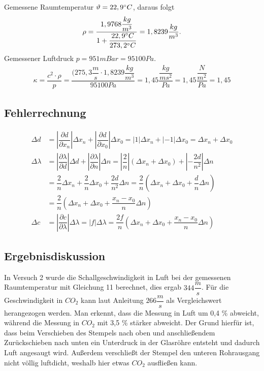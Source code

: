 \documentclass{scrartcl}
\begin{document}
Gemessene Raumtemperatur $\vartheta = 22,9\degree C$, daraus folgt 
\begin{align*}
\rho =  \dfrac{1,9768 \dfrac{kg}{m^3}}{1 + \dfrac{22,9\degree C}{273,2 \degree C}} = 1,8239 \dfrac{kg}{m^3}.
\end{align*}
Gemessener Luftdruck $p = 951 mBar = 95100 Pa$.
\begin{align*}
\kappa = \dfrac{c^2 \cdot \rho}{p} = \dfrac{(275,3 \dfrac{m}{s} \cdot 1,8239 \dfrac{kg}{m^3}}{95100 Pa} = 1,45 \dfrac{\dfrac{kg}{ms^2}}{Pa} = 1,45 \dfrac{\dfrac{N}{m^2}}{Pa} = 1,45
\end{align*}
\subsection{Fehlerrechnung}
\begin{align*}
\Delta d & = \left| \dfrac{\partial d}{\partial x_{n}} \right| \Delta x_{n} + \left| \dfrac{\partial d}{\partial x_{0}} \right| \Delta x_{0} = \left| 1 \right| \Delta x_{n} + \left| -1 \right| \Delta x_{0} = \Delta x_{n} + \Delta x_{0} \\
\Delta \lambda & = \left| \dfrac{\partial \lambda}{\partial d} \right| \Delta d + \left| \dfrac{\partial \lambda}{\partial n} \right| \Delta n = \left| \dfrac{2}{n} \right| (\Delta x_{n} + \Delta x_{0}) + \left| - \dfrac{2d}{n^2} \right| \Delta n \\
& = \dfrac{2}{n} \Delta x_{n} + \dfrac{2}{n} \Delta x_{0} + \dfrac{2d}{n^2} \Delta n = \dfrac{2}{n} (\Delta x_{n} + \Delta x_{0} + \dfrac{d}{n} \Delta n) \\
& = \dfrac{2}{n} (\Delta x_{n} + \Delta x_{0} + \dfrac{x_{n} - x_{0}}{n} \Delta n)\\
\Delta c & = \left| \dfrac{\partial c}{\partial \lambda} \right| \Delta \lambda = \left| f \right| \Delta \lambda = \dfrac{2f}{n} (\Delta x_{n} + \Delta x_{0} + \dfrac{x_{n} - x_{0}}{n} \Delta n)
\end{align*}
\subsection{Ergebnisdiskussion}
In Versuch 2 wurde die Schallgeschwindigkeit in Luft bei der gemessenen Raumtemperatur mit Gleichung 11 berechnet, dies ergab $344 \dfrac{m}{s}$.
Für die Geschwindigkeit in $CO_{2}$ kann laut Anleitung $266 \dfrac{m}{s}$ als Vergleichswert herangezogen werden.
Man erkennt, dass die Messung in Luft um 0,4 \% abweicht, während die Messung in $CO_{2}$ mit 3,5 \% stärker abweicht. Der Grund hierfür ist, dass beim Verschieben des Stempels nach oben und anschließendem Zurückschieben nach unten ein Unterdruck in der Glasröhre entsteht und dadurch Luft angesaugt wird. Außerdem verschließt der Stempel den unteren Rohrausgang nicht völlig luftdicht, weshalb hier etwas $CO_{2}$ ausfließen kann.
\end{document}
